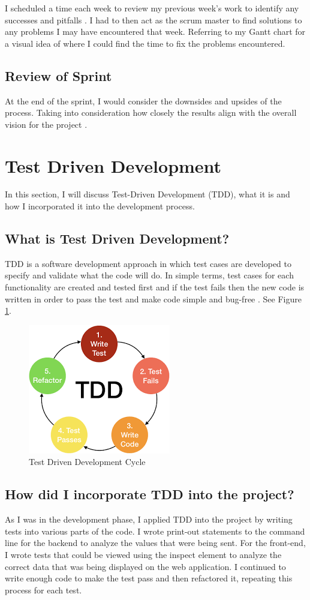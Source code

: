 I scheduled a time each week to review my previous week's work to identify any successes and pitfalls \cite{Scrum}. I had to then act as the scrum master to find solutions to any problems I may have encountered that week. Referring to my Gantt chart for a visual idea of where I could find the time to fix the problems encountered.

\subsection{Review of Sprint}
At the end of the sprint, I would consider the downsides and upsides of the process. Taking into consideration how closely the results align with the overall vision for the project \cite{Scrum}. 

\section{Test Driven Development}
In this section, I will discuss Test-Driven Development (TDD), what it is and how I incorporated it into the development process.

\subsection{What is Test Driven Development?}
TDD is a software development approach in which test cases are developed to specify and validate what the code will do. In simple terms, test cases for each functionality are created and tested first and if the test fails then the new code is written in order to pass the test and make code simple and bug-free \cite{TDD}. See Figure \ref{TDD}.

\begin{figure}[h]
\centering
\includegraphics[scale=0.5]{img/TDD.png}
\caption{Test Driven Development Cycle}
\label{TDD}
\end{figure}

\subsection{How did I incorporate TDD into the project?}
As I was in the development phase, I applied TDD into the project by writing tests into various parts of the code. I wrote print-out statements to the command line for the backend to analyze the values that were being sent. For the front-end, I wrote tests that could be viewed using the inspect element to analyze the correct data that was being displayed on the web application. I continued to write enough code to make the test pass and then refactored it, repeating this process for each test. 

